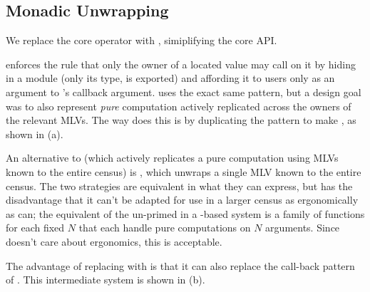 \subsection{Monadic Unwrapping}
We replace the core operator  with , simiplifying the core API.

\HasChor enforces the rule that only the owner of a located value may call  on it
by hiding  in a module (only its type,  is exported)
and affording it to users only as an argument to 's callback argument.
\MultiChor uses the exact same pattern, but a design goal was to also represent \emph{pure} computation
actively replicated across the owners of the relevant MLVs.
The way \MultiChor does this is by duplicating the  pattern
to make ,
as shown in (a).

An alternative to 
(which actively replicates a pure computation using MLVs known to the entire census)
is ,
which unwraps a single MLV known to the entire census.
The two strategies are equivalent in what they can express,
but  has the disadvantage that it can't be adapted for use in a larger census as ergonomically as  can;
the equivalent of the un-primed  in a -based system is a family of
functions for each fixed $N$ that each handle pure computations on $N$ arguments.
Since \minichor doesn't care about ergonomics, this is acceptable.

The advantage of replacing  with  is that it can also replace the call-back pattern of .
This intermediate system is shown in (b).

